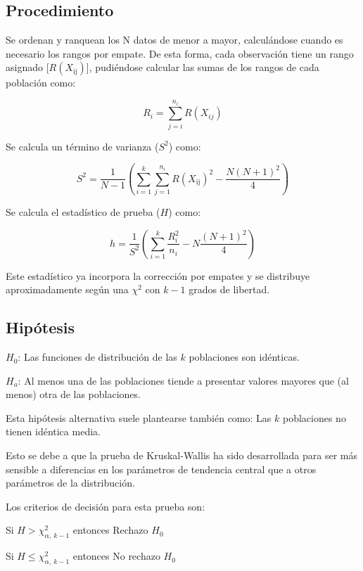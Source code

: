 \documentclass[]{book}
\theoremstyle{definition}
\theoremstyle{definition}
\theoremstyle{definition}
\theoremstyle{remark}
\begin{document}
\hypertarget{procedimiento-1}{%
\subsection{Procedimiento}\label{procedimiento-1}}

Se ordenan y ranquean los N datos de menor a mayor, calculándose cuando
es necesario los rangos por empate. De esta forma, cada observación
tiene un rango asignado {[}\(R(X_{\text{ij}})\){]}, pudiéndose calcular
las sumas de los rangos de cada población como:

\[
R_{i} = \sum_{j = i}^{n_{i}}{R(X_{ij})}
\]

Se calcula un término de varianza (\(S^{2}\)) como:

\[
S^{2} = \frac{1}{N - 1}\left( \sum_{i = 1}^{k}{\sum_{j = 1}^{n_{i}}{R\left( X_{\text{ij}} \right)^{2}}} - \frac{N\left( N + 1 \right)^{2}}{4} \right)
\]

Se calcula el estadístico de prueba (\(H\)) como:

\[
h = \frac{1}{S^{2}}\left( \sum_{i = 1}^{k}\frac{R_{i}^{2}}{n_{i}} - N\frac{\left( N + 1 \right)^{2}}{4} \right)
\]

Este estadístico ya incorpora la corrección por empates y se distribuye
aproximadamente según una \(\chi^{2}\) con \(k - 1\) grados de libertad.

\hypertarget{hipotesis-3}{%
\subsection{Hipótesis}\label{hipotesis-3}}

\(H_{0}\): Las funciones de distribución de las \(k\) poblaciones son
idénticas.

\(H_{a}\): Al menos una de las poblaciones tiende a presentar valores
mayores que (al menos) otra de las poblaciones.

Esta hipótesis alternativa suele plantearse también como: Las \(k\)
poblaciones no tienen idéntica media.

Esto se debe a que la prueba de Kruskal-Wallis ha sido desarrollada para
ser más sensible a diferencias en los parámetros de tendencia central
que a otros parámetros de la distribución.

Los criterios de decisión para esta prueba son:

Si \(H > \chi_{\alpha,\ k - 1}^{2}\) entonces Rechazo \(H_{0}\)

Si \(H \leq \chi_{\alpha,\ k - 1}^{2}\) entonces No rechazo \(H_{0}\)
\end{document}

